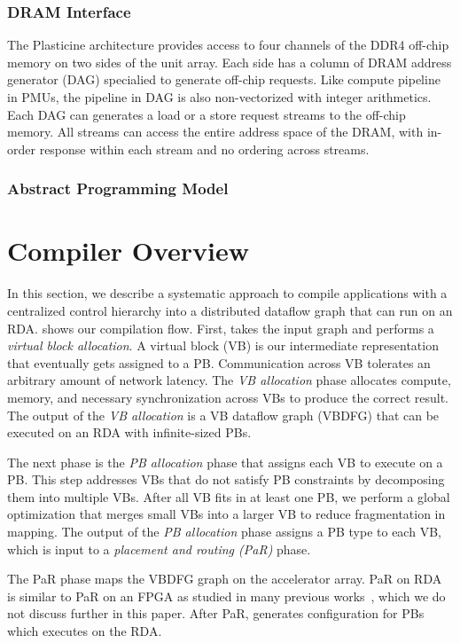 \subsubsection{DRAM Interface}
The Plasticine architecture provides access to four channels of the DDR4 off-chip memory on two sides of the
unit array. Each side has a column of DRAM address generator (DAG) specialied to generate off-chip
requests. Like compute pipeline in PMUs, the pipeline in DAG is also non-vectorized with integer
arithmetics. Each DAG can generates a load or a store request streams to the off-chip memory. All
streams can access the entire address space of the DRAM, with in-order response within each stream
and no ordering across streams.

\subsubsection{Abstract Programming Model}

\section{Compiler Overview}
In this section, we describe a systematic approach to compile applications with a centralized control hierarchy 
into a distributed dataflow graph that can run on an RDA.
 shows our compilation flow.
First, \name{} takes the input graph and performs a {\em virtual block allocation}.
A virtual block (VB) is our intermediate representation that eventually gets assigned to a PB.
Communication across VB tolerates an arbitrary amount of network latency.
The {\em VB allocation} phase allocates compute, memory, and necessary synchronization across VBs to produce the correct result.
The output of the {\em VB allocation} is a VB dataflow graph (VBDFG) that can be executed on an RDA with infinite-sized PBs.

The next phase is the {\em PB allocation} phase that assigns each VB to execute on a PB. 
This step addresses VBs that do not satisfy PB constraints by decomposing them into multiple VBs.
After all VB fits in at least one PB, we perform a global optimization that merges 
small VBs into a larger VB to reduce fragmentation in mapping.
The output of the {\em PB allocation} phase assigns a PB type to each VB, which is input to a {\em placement and routing (PaR)} phase.

The PaR phase maps the VBDFG graph on the accelerator array.
PaR on RDA is similar to PaR on an FPGA as studied in many previous works~\cite{network}, which we do not discuss further in this paper. 
After PaR, \name{} generates configuration for PBs which executes on the RDA.

